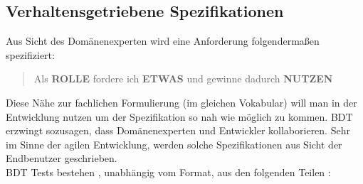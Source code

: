 \subsection{Verhaltensgetriebene Spezifikationen}
Aus Sicht des Domänenexperten wird eine Anforderung folgendermaßen spezifiziert: 

\begin{quote}Als \textbf{ROLLE} fordere ich \textbf{ETWAS} und gewinne dadurch \textbf{NUTZEN} \cite{north_official_2015}\end{quote}

Diese Nähe zur fachlichen Formulierung (im gleichen Vokabular) will man in der Entwicklung nutzen um der Spezifikation so nah wie möglich zu kommen. \Gls{BDT} erzwingt sozusagen, dass Domänenexperten und Entwickler kollaborieren. Sehr im Sinne der agilen Entwicklung, werden solche Spezifikationen aus Sicht der Endbenutzer geschrieben.\\
\Gls{BDT} Tests bestehen , unabhängig vom Format, aus den folgenden Teilen \cite{haring_bdd_2003}:

